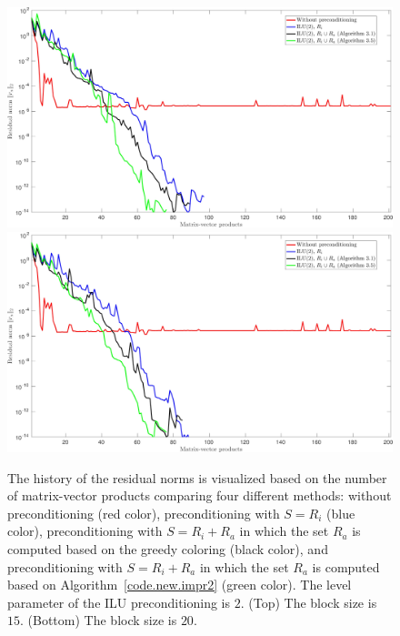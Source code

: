 \documentclass[12pt, twoside,a4paper,toc=bibliography]{scrbook}
\newcommand{\coderef}[1]{Algorithm~\protect\ref{#1}}
\begin{document}
\begin{figure}
\centering
\includegraphics[width=\linewidth]{jac_convergence_greedy_new_15.jpg}
\includegraphics[width=\linewidth]{jac_convergence_greedy_new_20.jpg}
\caption{
The history of the residual norms is visualized based on 
the number of matrix-vector products comparing four different methods:
without preconditioning (red color), 
preconditioning with $S=R_i$ (blue color),
preconditioning with $S=R_i + R_a$ in which 
the set $R_a$ is computed based on the greedy coloring (black color),
and preconditioning with $S=R_i + R_a$ in which 
the set $R_a$ is computed based on \coderef{code.new.impr2} (green color).
The level parameter of the ILU preconditioning is $2$.
(Top) The block size is $15$. 
(Bottom) The block size is $20$.
}
\label{f.convergence_greedy_new3}
\end{figure}
\end{document}
